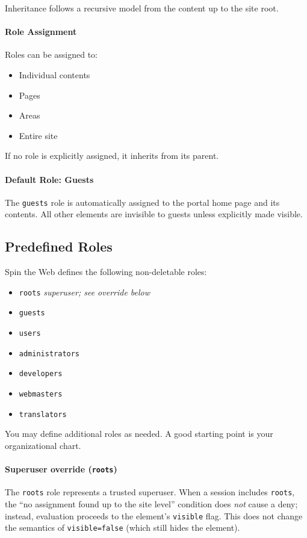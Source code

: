 Inheritance follows a recursive model from the content up to the site root.

\paragraph{Role Assignment}
Roles can be assigned to:
\begin{itemize}
	\item Individual contents
	\item Pages
	\item Areas
	\item Entire site
\end{itemize}
If no role is explicitly assigned, it inherits from its parent.

\paragraph{Default Role: Guests}
The \texttt{guests} role is automatically assigned to the portal home page and its contents. All other elements are invisible to guests unless explicitly made visible.

\subsection{Predefined Roles}

Spin the Web defines the following non-deletable roles:

\begin{itemize}
	\item \texttt{roots} \hfill\emph{superuser; see override below}
	\item \texttt{guests}
	\item \texttt{users}
	\item \texttt{administrators}
	\item \texttt{developers}
	\item \texttt{webmasters}
	\item \texttt{translators}
\end{itemize}

You may define additional roles as needed. A good starting point is your organizational chart.

\paragraph{Superuser override (\texttt{roots})}
The \texttt{roots} role represents a trusted superuser. When a session includes \texttt{roots}, the “no assignment found up to the site level” condition does \emph{not} cause a deny; instead, evaluation proceeds to the element’s \texttt{visible} flag. This does not change the semantics of \texttt{visible=false} (which still hides the element).

